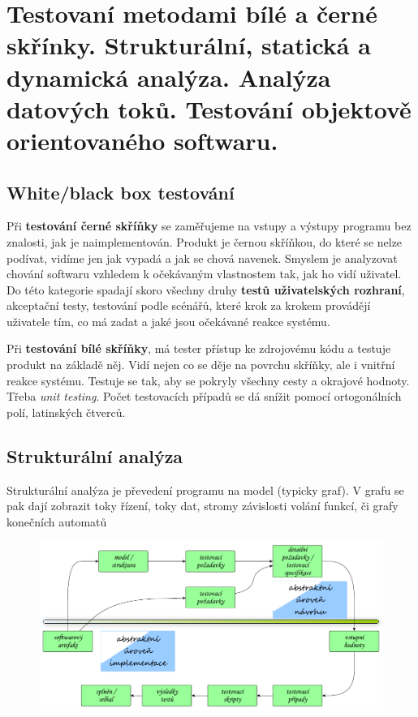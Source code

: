\section[TVS]{Testovaní metodami bílé a černé skřínky. Strukturální, statická a dynamická analýza. Analýza datových toků. Testování objektově orientovaného softwaru.}

\subsection{White/black box testování}

Při \textbf{testování černé skříňky} se zaměřujeme na vstupy a výstupy programu bez znalosti, jak je naimplementován. Produkt je černou skříňkou, do které se nelze podívat, vidíme jen jak vypadá a jak se chová navenek. Smyslem je analyzovat chování softwaru vzhledem k očekávaným vlastnostem tak, jak ho vidí uživatel. Do této kategorie spadají skoro všechny druhy \textbf{testů uživatelských rozhraní}, akceptační testy, testování podle scénářů, které krok za krokem provádějí uživatele tím, co má zadat a jaké jsou očekávané reakce systému.

Při \textbf{testování bílé skříňky}, má tester přístup ke zdrojovému kódu a testuje produkt na základě něj. Vidí nejen co se děje na povrchu skříňky, ale i vnitřní reakce systému. Testuje se tak, aby se pokryly všechny cesty a okrajové hodnoty. Třeba \textit{unit testing}. Počet testovacích případů se dá snížit pomocí ortogonálních polí, latinských čtverců.

\subsection{Strukturální analýza}

Strukturální analýza je převedení programu na model (typicky graf). V grafu se pak dají zobrazit toky řízení, toky dat, stromy závislosti volání funkcí, či grafy konečních automatů

\begin{figure}[h!]
\centering
\includegraphics[width=130mm]{14/images/test-model}
\end{figure}

